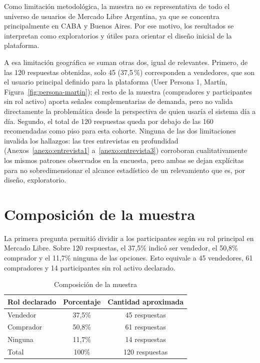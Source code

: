 Como limitación metodológica, la muestra no es representativa de todo el universo de usuarios de Mercado Libre Argentina, ya que se concentra principalmente en CABA y Buenos Aires. Por ese motivo, los resultados se interpretan como exploratorios y útiles para orientar el diseño inicial de la plataforma.

A esa limitación geográfica se suman otras dos, igual de relevantes. Primero, de las 120 respuestas obtenidas, solo 45 (37,5\,\%) corresponden a vendedores, que son el usuario principal definido para la plataforma (User Persona 1, Martín, Figura~\ref{fig:persona-martin}); el resto de la muestra (compradores y participantes sin rol activo) aporta señales complementarias de demanda, pero no valida directamente la problemática desde la perspectiva de quien usaría el sistema día a día. Segundo, el total de 120 respuestas queda por debajo de las 160 recomendadas como piso para esta cohorte. Ninguna de las dos limitaciones invalida los hallazgos: las tres entrevistas en profundidad (Anexos~\ref{anexo:entrevista1} a~\ref{anexo:entrevista3}) corroboran cualitativamente los mismos patrones observados en la encuesta, pero ambas se dejan explícitas para no sobredimensionar el alcance estadístico de un relevamiento que es, por diseño, exploratorio.

\section{Composición de la muestra}

La primera pregunta permitió dividir a los participantes según su rol principal en Mercado Libre. Sobre 120 respuestas, el 37,5\% indicó ser vendedor, el 50,8\% comprador y el 11,7\% ninguna de las opciones. Esto equivale a 45 vendedores, 61 compradores y 14 participantes sin rol activo declarado.

\begin{table}[ht]
	\centering
	\caption{Composición de la muestra}
	\label{tab:composicion}
	\begin{tabularx}{0.7\textwidth}{@{}X c c@{}}
		\toprule
		\textbf{Rol declarado} & \textbf{Porcentaje} & \textbf{Cantidad aproximada} \\
		\midrule
		Vendedor & 37,5\% & 45 respuestas \\
		Comprador & 50,8\% & 61 respuestas \\
		Ninguna & 11,7\% & 14 respuestas \\
		Total & 100\% & 120 respuestas \\
		\bottomrule
	\end{tabularx}
\end{table}


